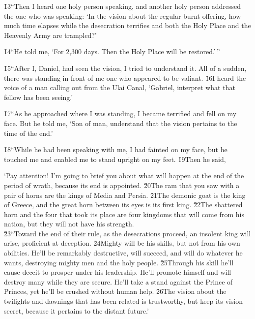 \v{13}``Then I heard one holy person speaking, and another holy person addressed the one who was speaking: `In the vision about the regular burnt offering, how much time elapses while the desecration terrifies and both the Holy Place and the Heavenly Army are trampled?'

\v{14}``He told me, `For 2,300 days. Then the Holy Place will be restored.'\,''

\v{15}``After I, Daniel, had seen the vision, I tried to understand it. All of a sudden, there was standing in front of me one who appeared to be valiant. \v{16}I heard the voice of a man calling out from the Ulai Canal, `Gabriel, interpret what that fellow has been seeing.'

\v{17}``As he approached where I was standing, I became terrified and fell on my face. But he told me, `Son of man, understand that the vision pertains to the time of the end.'

\v{18}``While he had been speaking with me, I had fainted on my face, but he touched me and enabled me to stand upright on my feet. \v{19}Then he said,

\begin{poetry}
\poeml `Pay attention! I'm going to brief you about what will happen at the end of the period of wrath, because its end is appointed. \v{20}The ram that you saw with a pair of horns are the kings of Media and Persia. \v{21}The demonic goat is the king of Greece, and the great horn between its eyes is its first king. \v{22}The shattered horn and the four that took its place are four kingdoms that will come from his nation, but they will not have his strength. \\
\poeml \v{23}``Toward the end of their rule, as the desecrations proceed, an insolent king will arise, proficient at deception. \v{24}Mighty will be his skills, but not from his own abilities. He'll be remarkably destructive, will succeed, and will do whatever he wants, destroying mighty men and the holy people. \v{25}Through his skill he'll cause deceit to prosper under his leadership. He'll promote himself and will destroy many while they are secure. He'll take a stand against the Prince of Princes, yet he'll be crushed without human help. \v{26}The vision about the twilights and dawnings that has been related is trustworthy, but keep its vision secret, because it pertains to the distant future.'
\end{poetry}


